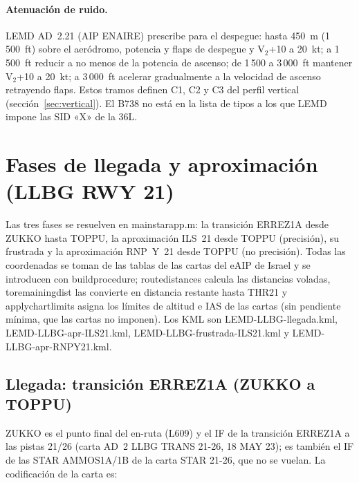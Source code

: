\documentclass[11pt,a4paper]{article}
\DeclareRobustCommand{\m}[1]{{\ttfamily\def\_{\textunderscore\penalty100\relax}#1}}
\begin{document}
\paragraph{Atenuación de ruido.} LEMD AD~2.21 (AIP ENAIRE) prescribe para el despegue: hasta 450~m (1\,500~ft) sobre el aeródromo, potencia y flaps de despegue y V$_2$+10 a 20~kt; a 1\,500~ft reducir a no menos de la potencia de ascenso; de 1\,500 a 3\,000~ft mantener V$_2$+10 a 20~kt; a 3\,000~ft acelerar gradualmente a la velocidad de ascenso retrayendo flaps. Estos tramos definen C1, C2 y C3 del perfil vertical (sección~\ref{sec:vertical}). El B738 no está en la lista de tipos a los que LEMD impone las SID «X» de la 36L.

\section{Fases de llegada y aproximación (LLBG RWY 21)}\label{sec:llegada}

Las tres fases se resuelven en \m{main\_star\_app.m}: la transición ERREZ1A desde ZUKKO hasta TOPPU, la aproximación ILS~21 desde TOPPU (precisión), su frustrada y la aproximación RNP~Y~21 desde TOPPU (no precisión). Todas las coordenadas se toman de las tablas de las cartas del eAIP de Israel y se introducen con \m{build\_procedure}; \m{route\_distances} calcula las distancias voladas, \m{to\_remaining\_dist} las convierte en distancia restante hasta THR21 y \m{apply\_chart\_limits} asigna los límites de altitud e IAS de las cartas (sin pendiente mínima, que las cartas no imponen). Los KML son \m{LEMD-LLBG-llegada.kml}, \m{LEMD-LLBG-apr-ILS21.kml}, \m{LEMD-LLBG-frustrada-ILS21.kml} y \m{LEMD-LLBG-apr-RNPY21.kml}.

\subsection{Llegada: transición ERREZ1A (ZUKKO a TOPPU)}

ZUKKO es el punto final del en-ruta (L609) y el IF de la transición ERREZ1A a las pistas 21/26 (carta AD~2 LLBG TRANS 21-26, 18 MAY 23); es también el IF de las STAR AMMOS1A/1B de la carta STAR 21-26, que no se vuelan. La codificación de la carta es:
\end{document}
